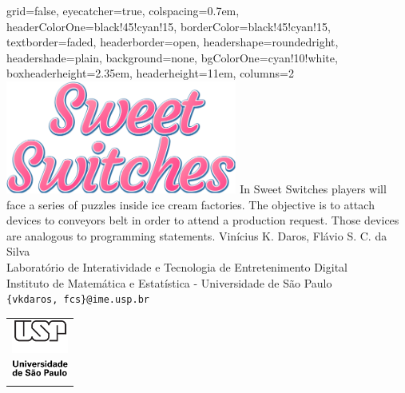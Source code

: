 \documentclass[landscape,a1paper,fontscale=0.292]{baposter}
\begin{document}
\begin{poster}{
    grid=false,
    eyecatcher=true, %
    colspacing=0.7em,
    headerColorOne=black!45!cyan!15,
    borderColor=black!45!cyan!15,
    textborder=faded,
    headerborder=open,
    headershape=roundedright,
    headershade=plain,
    background=none,
    bgColorOne=cyan!10!white,
    boxheaderheight=2.35em,
    headerheight=11em,
    columns=2
}
{
    \includegraphics[height=10em]{sweetswitches}
}
{
    \small
    In Sweet Switches players will face a series of puzzles inside ice cream
    factories. The objective is to attach devices to conveyors belt in order to
    attend a production request. Those devices are analogous to programming
    statements.
}
{
    \small
    Vinícius K. Daros, Flávio S. C. da Silva\\[0.5em]
    Laboratório de Interatividade e Tecnologia de Entretenimento Digital
    \\[0.15em]
    Instituto de Matemática e Estatística - Universidade de São Paulo\\[0.5em]
    \texttt{\{vkdaros, fcs\}@ime.usp.br}
}
{
    \parbox[t][5em][b]{8.5em}{
        \begin{tabular}{l}
            \includegraphics[width=5em]{usp-logo}\\
            \includegraphics[width=5em]{universidade}
        \end{tabular}
    }
}


\end{poster}
\end{document}
